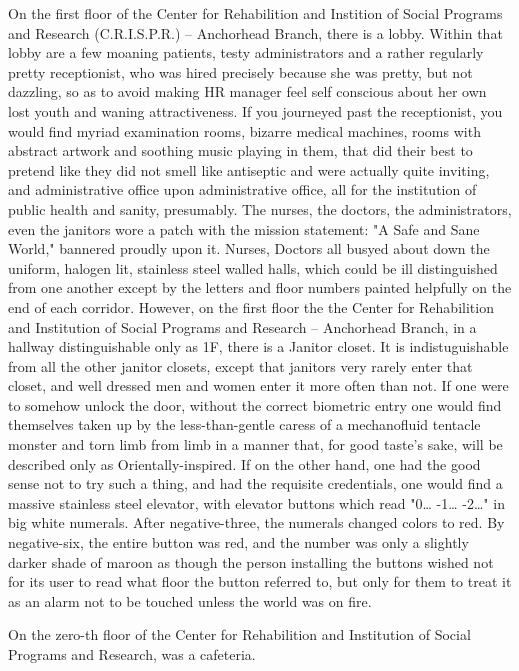 \documentclass[12pt]{article}
\begin{document}
On the first floor of the Center for Rehabilition and Instition of Social Programs and Research (C.R.I.S.P.R.) -- Anchorhead Branch, there is a lobby. Within that lobby are a few moaning patients, testy administrators and a rather regularly pretty receptionist, who was hired precisely because she was pretty, but not dazzling, so as to avoid making HR manager feel self conscious about her own lost youth and waning attractiveness. If you journeyed past the receptionist, you would find myriad examination rooms, bizarre medical machines, rooms with abstract artwork and soothing music playing in them, that did their best to pretend like they did not smell like antiseptic and were actually quite inviting, and administrative office upon administrative office, all for the institution of public health and sanity, presumably. The nurses, the doctors, the administrators, even the janitors wore a patch with the mission statement: "A Safe and Sane World," bannered proudly upon it. Nurses, Doctors all busyed about down the uniform, halogen lit, stainless steel walled halls, which could be ill distinguished from one another except by the letters and floor numbers painted helpfully on the end of each corridor. However, on the first floor the the Center for Rehabilition and Institution of Social Programs and Research -- Anchorhead Branch, in a hallway distinguishable only as 1F, there is a Janitor closet. It is indistuguishable from all the other janitor closets, except that janitors very rarely enter that closet, and well dressed men and women enter it more often than not. If one were to somehow unlock the door, without the correct biometric entry one would find themselves taken up by the less-than-gentle caress of a mechanofluid tentacle monster and torn limb from limb in a manner that, for good taste's sake, will be described only as Orientally-inspired. If on the other hand, one had the good sense not to try such a thing, and had the requisite credentials, one would find a massive stainless steel elevator, with elevator buttons which read "0\ldots{} -1\ldots{} -2\ldots{}" in big white numerals. After negative-three, the numerals changed colors to red. By negative-six, the entire button was red, and the number was only a slightly darker shade of maroon as though the person installing the buttons wished not for its user to read what floor the button referred to, but only for them to treat it as an alarm not to be touched unless the world was on fire.

On the zero-th floor of the Center for Rehabilition and Institution of Social Programs and Research, was a cafeteria.
\end{document}
